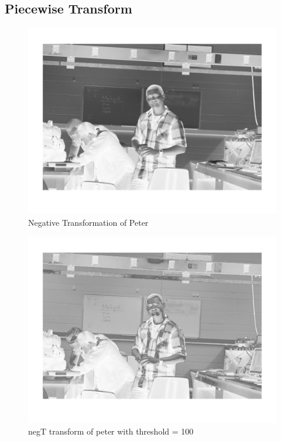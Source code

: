 \subsection{Piecewise Transform}

\begin{figure}[H]
    \centering
    \includegraphics[scale=0.8]{peter_neg}
    \caption{Negative Transformation of Peter}
\end{figure}

\begin{figure}[H]
    \centering
    \includegraphics[scale=0.8]{peter_partial}
    \caption{negT transform of peter with threshold = 100}
\end{figure}

